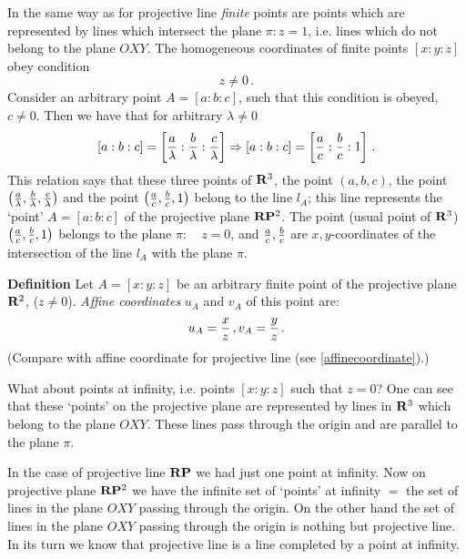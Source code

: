 \documentclass[12pt]{article}
\numberwithin{equation}{section}
\begin{document}
 In the same way as for projective line {\it finite} points
are points which are represented by lines which intersect the plane
$\pi\colon z=1$, i.e. lines which do not belong to 
   the plane $OXY$.   The homogeneous coordinates of
finite points $[x:y:z]$ obey condition
        \begin{equation}\label{finitepoint}
            z\not=0\,.
           \end{equation}
Consider an arbitrary point  $A=[a:b:c]$,
such that this condition is obeyed, $c\not=0$.
Then we have that  for arbitrary $\lambda\not=0$
                 $$
       [a:b:c]=
           \left[
         {a\over \lambda}:
         {b\over \lambda}:
         {c\over \lambda}
                  \right]\Rightarrow
[a:b:c]=    \left[
         {a\over c}:
         {b\over c}:
                1
                  \right]\,.
                  $$
This relation says that these three points of ${\bf R}^3$,
   the point $(a,b,c)$, the point   
$\left(
         {a\over \lambda},
         {b\over \lambda},
         {c\over \lambda}
                  \right)$ and the point
 $\left(
         {a\over c},
         {b\over c},
                1
                  \right)$ 
belong  to the line
    $l_A$; this line  represents the `point' $A=[a:b:c]$ of the projective
plane ${\bf R}{\bf P}^2$. The point (usual point of ${\bf R}^3$)
 $\left(
         {a\over c},
         {b\over c},
                1
                  \right)$ 
belongs to the plane $\pi\colon\quad z=0$, and
    ${a\over c},{b\over c}$ are $x,y$-coordinates of the 
intersection of the line $l_A$ with the plane  $\pi$.

 
{\bf Definition} Let $A=[x:y:z]$ be an arbitrary finite point
of the projective plane ${\bf R}^2$, ($z\not=0$).
 {\it Affine coordinates} $u_A$ and $v_A$
of this point are:
       \begin{equation}\label{affinecoordinates}
             u_A={x\over z}\,,
             v_A={y\over z}\,.
           \end{equation}
      (Compare with affine coordinate for projective line (see
 \eqref{affinecoordinate}).)


  What about points at infinity, i.e. points $[x:y:z]$ such that $z=0$?
One can see that these `points' on the projective plane
are represented by lines in ${\bf R}^3$
   which belong to the plane $OXY$. These lines
pass through the origin and  are parallel to the plane $\pi$.



In the case of projective line ${\bf R}{\bf P}$ we had just one point
at infinity.   Now on projective plane ${\bf R}{\bf P}^2$ we 
have the infinite set of `points' at infinity
$=$ the set of lines in the plane $OXY$ passing through the origin.
On the other hand the set of lines in the plane $OXY$ passing through
the origin is nothing but projective line.
In its turn we know that projective line is a line completed
by a point at infinity. 
\end{document}
